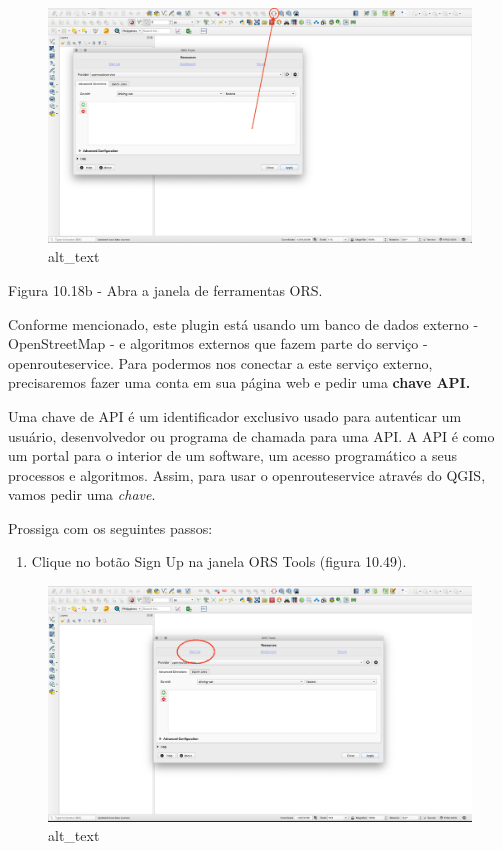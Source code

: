 \documentclass[
  portuguese,
]{krantz}
\providecommand{\tightlist}{%
  \setlength{\itemsep}{0pt}\setlength{\parskip}{0pt}}
\begin{document}
\begin{figure}
\centering
\includegraphics{media/modulo10/fig1018_b.png}
\caption{alt\_text}
\end{figure}

Figura 10.18b - Abra a janela de ferramentas ORS.

Conforme mencionado, este plugin está usando um banco de dados externo - OpenStreetMap - e algoritmos externos que fazem parte do serviço - openrouteservice. Para podermos nos conectar a este serviço externo, precisaremos fazer uma conta em sua página web e pedir uma \textbf{chave API.}

Uma chave de API é um identificador exclusivo usado para autenticar um usuário, desenvolvedor ou programa de chamada para uma API. A API é como um portal para o interior de um software, um acesso programático a seus processos e algoritmos. Assim, para usar o openrouteservice através do QGIS, vamos pedir uma \emph{chave}.

Prossiga com os seguintes passos:

\begin{enumerate}
\def\labelenumi{\arabic{enumi}.}
\tightlist
\item
  Clique no botão Sign Up na janela ORS Tools (figura 10.49).
\end{enumerate}

\begin{figure}
\centering
\includegraphics{media/modulo10/fig1018_c.png}
\caption{alt\_text}
\end{figure}
\end{document}
